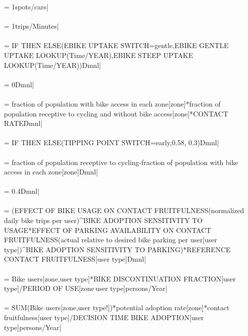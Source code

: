  = {\small 1spots/cars|} \\ \\ 
 = {\small 1trips/Minutes|} \\ \\ 
 = {\small IF THEN ELSE(EBIKE UPTAKE SWITCH=gentle,EBIKE GENTLE UPTAKE LOOKUP(Time/YEAR),EBIKE STEEP UPTAKE LOOKUP(Time/YEAR))Dmnl|} \\ \\ 
 = {\small 0Dmnl|} \\ \\ 
 = {\small fraction of population with bike access in each zone[zone]*fraction of population receptive to cycling and without bike access[zone]*CONTACT RATEDmnl|} \\ \\ 
 = {\small IF THEN ELSE(TIPPING POINT SWITCH=early,0.58, 0.3)Dmnl|} \\ \\ 
 = {\small fraction of population receptive to cycling-fraction of population with bike access in each zone[zone]Dmnl|} \\ \\ 
 = {\small 0.4Dmnl|} \\ \\ 
 = {\small (EFFECT OF BIKE USAGE ON CONTACT FRUITFULNESS(normalized daily bike trips per user)\^{}BIKE ADOPTION SENSITIVITY TO USAGE*EFFECT OF PARKING AVAILABILITY ON CONTACT FRUITFULNESS(actual relative to desired bike parking per user[user type])\^{}BIKE ADOPTION SENSITIVITY TO PARKING)*REFERENCE CONTACT FRUITFULNESS[user type]Dmnl|} \\ \\ 
 = {\small Bike users[zone,user type]*BIKE DISCONTINUATION FRACTION[user type]/PERIOD OF USE[zone\,user type]persons/Year|} \\ \\ 
 = {\small SUM(Bike users[zone,user type!])*potential adoption rate[zone]*contact fruitfulness[user type]/DECISION TIME BIKE ADOPTION[user type]persons/Year|} \\ \\ 
